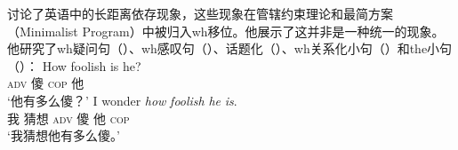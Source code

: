 \begin{exe}
\begin{xlist}[iv.]
\begin{exe}
\begin{xlist}[iv.]
\citet{Sag2010b}讨论了英语中的长距离依存现象，这些现象在管辖约束理论和最简方案\indexmpc（Minimalist Program）中被归入wh移位。他展示了这并非是一种统一的现象。他研究了wh疑问句（）、wh感叹句（）、话题化（）、wh关系化小句（）和the小句（）：
\eal
\ex
\gll How foolish is he?\\
     \textsc{adv} 傻 \textsc{cop} 他\\
\glt `他有多么傻？' 
\ex
\gll I wonder \emph{how} \emph{foolish} \emph{he} \emph{is}.\\
     我 猜想 \textsc{adv} 傻 他 \textsc{cop}\\
\glt `我猜想他有多么傻。'
\zl


\end{xlist}
\end{exe}
\end{xlist}
\end{exe}
